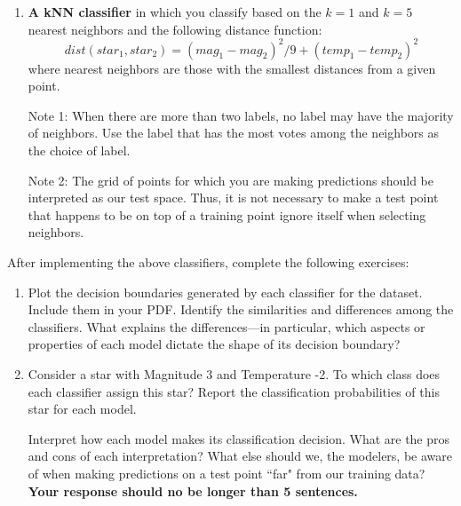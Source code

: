\documentclass[submit]{harvardml}
\begin{document}
\begin{problem}
\begin{enumerate}[label=\alph*)]
\item \textbf{A kNN classifier} in which you classify based on the $k = 1$ and $k = 5$ nearest neighbors and the following distance function: $$dist(star_1, star_2) = (mag_1 - mag_2)^2/9 + (temp_1 - temp_2)^2$$
where nearest neighbors are those with the smallest distances from a given point.

  Note 1: When there are more than two labels, no label may have the
  majority of neighbors.  Use the label that has the most votes among
  the neighbors as the choice of label. 

  Note 2: The grid of points for which you are making predictions
  should be interpreted as our test space.  Thus, it is not necessary
  to make a test point that happens to be on top of a training point
  ignore itself when selecting neighbors.

\end{enumerate}

After implementing the above classifiers, complete the following exercises:

\begin{enumerate}
    \item Plot the decision boundaries generated by each classifier for the dataset. Include them in your PDF. 
    Identify the similarities and differences among the classifiers. What explains the differences---in particular, which aspects or properties of each model dictate the shape of its decision boundary? 
    
    \item 
    
    Consider a star with Magnitude 3 and Temperature -2. To which class does each classifier assign this star? Report the classification probabilities of this star for each model. 
    
    Interpret how each model makes its classification decision. What are the pros and cons of each interpretation? What else should we, the modelers, be aware of when making predictions on a test point ``far" from our training data? \textbf{Your response should no be longer than 5 sentences.}
\end{enumerate}
\end{problem} \\
\end{document}
